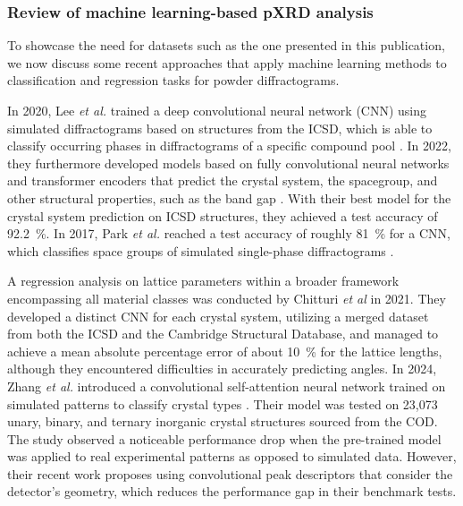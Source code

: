 \subsubsection*{Review of machine learning-based pXRD analysis}
To showcase the need for datasets such as the one presented in this publication, we now discuss some recent approaches that apply machine learning methods to classification and regression tasks for powder diffractograms.

In 2020, Lee {\it et al.} trained a deep convolutional neural network (CNN) using simulated diffractograms based on structures from the ICSD, which is able to classify occurring phases in diffractograms of a specific compound pool \cite{Lee2020}. In 2022, they furthermore developed models based on fully convolutional neural networks and transformer encoders that predict the crystal system, the spacegroup, and other structural properties, such as the band gap \cite{Lee2022}. With their best model for the crystal system prediction on ICSD structures, they achieved a test accuracy of \SI{92.2}{\percent}. In 2017, Park {\it et al.} reached a test accuracy of roughly \SI{81}{\percent} for a CNN, which classifies space groups of simulated single-phase diffractograms \cite{Park2017}.

A regression analysis on lattice parameters within a broader framework encompassing all material classes was conducted by Chitturi {\it et al} \cite{Chitturi2021} in 2021. They developed a distinct CNN for each crystal system, utilizing a merged dataset from both the ICSD and the Cambridge Structural Database, and managed to achieve a mean absolute percentage error of about \SI{10}{\percent} for the lattice lengths, although they encountered difficulties in accurately predicting angles.
In 2024, Zhang {\it et al.} introduced a convolutional self-attention neural network trained on simulated patterns to classify crystal types \cite{zhang2024crystallographic}. Their model was tested on 23,073 unary, binary, and ternary inorganic crystal structures sourced from the COD. The study observed a noticeable performance drop when the pre-trained model was applied to real experimental patterns as opposed to simulated data. However, their recent work \cite{cao2024simxrd} proposes using convolutional peak descriptors that consider the detector's geometry, which reduces the performance gap in their benchmark tests.

